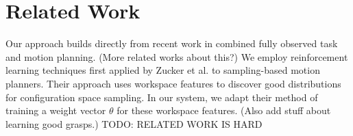 \section{Related Work}
Our approach builds directly from recent work in combined fully observed
task and motion planning. (More related works about this?)
We employ reinforcement learning techniques first applied by Zucker et al.
to sampling-based motion planners. Their approach uses workspace features to
discover good distributions for configuration space sampling. In our system,
we adapt their method of training a weight vector $\theta$ for these workspace features.
(Also add stuff about learning good grasps.)
TODO: RELATED WORK IS HARD